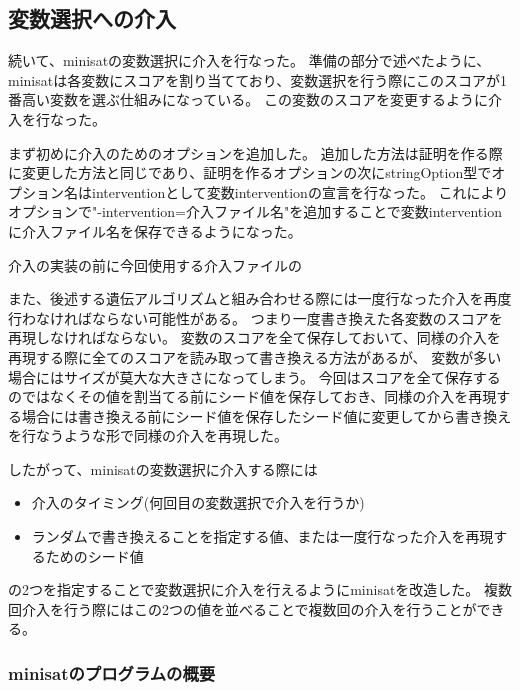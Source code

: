 \subsection{変数選択への介入}







続いて、minisatの変数選択に介入を行なった。
準備の部分で述べたように、minisatは各変数にスコアを割り当てており、変数選択を行う際にこのスコアが1番高い変数を選ぶ仕組みになっている。
この変数のスコアを変更するように介入を行なった。

まず初めに介入のためのオプションを追加した。
追加した方法は証明を作る際に変更した方法と同じであり、証明を作るオプションの次にstringOption型でオプション名はinterventionとして変数interventionの宣言を行なった。
これによりオプションで"-intervention=介入ファイル名"を追加することで変数interventionに介入ファイル名を保存できるようになった。

介入の実装の前に今回使用する介入ファイルの

また、後述する遺伝アルゴリズムと組み合わせる際には一度行なった介入を再度行わなければならない可能性がある。
つまり一度書き換えた各変数のスコアを再現しなければならない。
変数のスコアを全て保存しておいて、同様の介入を再現する際に全てのスコアを読み取って書き換える方法があるが、
変数が多い場合にはサイズが莫大な大きさになってしまう。
今回はスコアを全て保存するのではなくその値を割当てる前にシード値を保存しておき、同様の介入を再現する場合には書き換える前にシード値を保存したシード値に変更してから書き換えを行なうような形で同様の介入を再現した。

したがって、minisatの変数選択に介入する際には
\begin{itemize}
	\item 介入のタイミング(何回目の変数選択で介入を行うか)
	\item ランダムで書き換えることを指定する値、または一度行なった介入を再現するためのシード値
\end{itemize}
の2つを指定することで変数選択に介入を行えるようにminisatを改造した。
複数回介入を行う際にはこの2つの値を並べることで複数回の介入を行うことができる。








\subsubsection{minisatのプログラムの概要}

